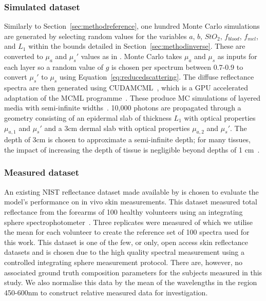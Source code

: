 \subsubsection{Simulated dataset}
Similarly to Section~\ref{sec:methodreference}, one hundred
Monte Carlo simulations are generated by selecting random values for the variables $a$, $b$, $StO_2$, $f_{blood}$, $f_{mel}$, and $L_1$ within the bounds detailed in Section~\ref{sec:methodinverse}.
These are converted to $\mu_a$ and $\mu_s'$ values as in . Monte Carlo takes $\mu_a$ and $\mu_s$ as inputs for each layer so a random value of $g$ is chosen per spectrum between 0.7-0.9 to convert $\mu_s'$ to $\mu_s$ using Equation~\eqref{eq:reducedscattering}. The diffuse reflectance spectra are then generated using CUDAMCML~\citep{Alerstam2008}, which is a GPU accelerated adaptation of the MCML programme~\citep{Prahl1989}. These produce MC simulations of layered media with semi-infinite widths~\citep{Wang1995, Prahl1989}. 10,000 photons are propagated through a geometry consisting of an epidermal slab of thickness $L_1$ with optical properties $\mu_{a,1}$ and $\mu_s'$ and a 3cm dermal slab with optical properties $\mu_{a, 2}$ and $\mu_s'$. The depth of 3cm is chosen to approximate a semi-infinite depth; for many tissues, the impact of increasing the depth of tissue is negligible beyond depths of 1 cm~\citep{Zhang2014}. %

\subsubsection{Measured dataset}
An existing NIST reflectance dataset made available by \citet{Cooksey2017} is chosen to evaluate the model's performance on in vivo skin measurements. This dataset measured total reflectance from the forearms of 100 healthy volunteers using an integrating sphere spectrophotometer~\citep{Cooksey2017}. Three replicates were measured of which we utilise the mean for each volunteer to create the reference set of 100 spectra used for this work. This dataset is one of the few, or only, open access skin reflectance datasets and is chosen due to the high quality spectral measurement using a controlled integrating sphere measurement protocol. There are, however, no associated ground truth composition parameters for the subjects measured in this study. We also normalise this data by the mean of the wavelengths in the region 450-600nm to construct relative measured data for investigation. 
\FloatBarrier


